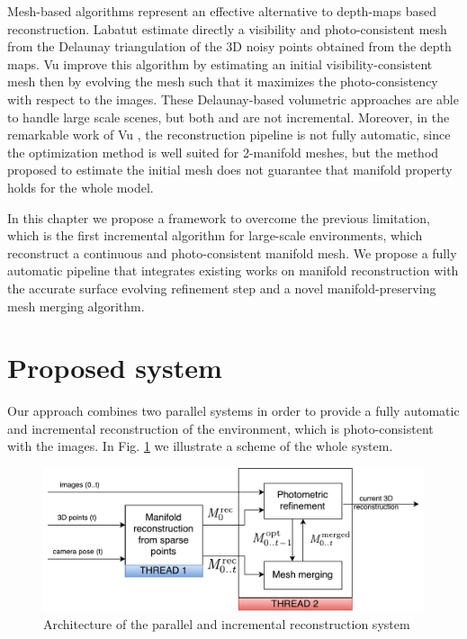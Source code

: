 Mesh-based algorithms represent an effective alternative to depth-maps based reconstruction. Labatut \etal \cite{labatut2007efficient} estimate directly a visibility and photo-consistent mesh from the Delaunay triangulation of the 3D noisy points obtained from the depth maps.
Vu \etal  \cite{vu_et_al_2012} improve this algorithm by estimating an initial visibility-consistent mesh then by evolving the mesh such that it maximizes the photo-consistency with respect to the images. 
These Delaunay-based volumetric approaches are able to handle large scale scenes, but both \cite{labatut2007efficient} and \cite{vu_et_al_2012}  are not incremental.
Moreover, in the remarkable work of Vu \etal \cite{vu_et_al_2012}, the reconstruction pipeline   is not fully automatic, since the optimization method is well suited for 2-manifold meshes, but the method proposed to estimate the initial mesh does not guarantee that manifold property holds for the whole model.



In this chapter we propose a framework to overcome the previous limitation, which is the first incremental algorithm for large-scale environments, which reconstruct a continuous and photo-consistent manifold mesh. 
We propose a fully automatic pipeline that integrates existing works on manifold reconstruction with the accurate surface evolving refinement step and a novel manifold-preserving mesh merging algorithm.


\section{Proposed system}
 Our approach combines two parallel systems in order to provide a fully automatic and incremental reconstruction of the environment, which is photo-consistent with the images. In Fig. \ref{fig:architecture} we illustrate a scheme of the whole system.
 
 \begin{figure}[t]
  \centering
  \includegraphics[width=\textwidth]{./img/ch-incr-dens/incremental-mvs-architecture}
  \caption{Architecture of the parallel and incremental reconstruction system}
  \label{fig:architecture}
\end{figure}


